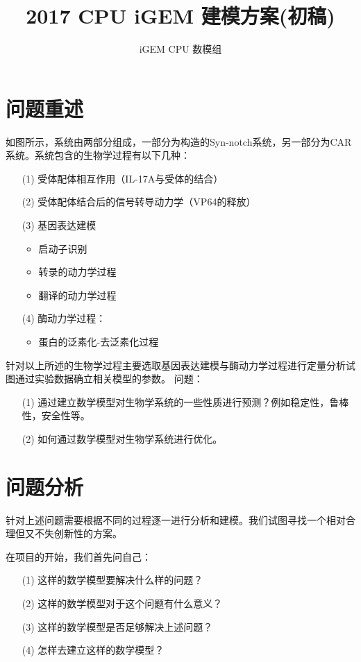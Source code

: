 \documentclass[UTF8]{ctexart}
\begin{document}
	\title{2017 CPU iGEM 建模方案(初稿)}
	\author{iGEM CPU 数模组}
	\maketitle
\section{问题重述}
如图所示，系统由两部分组成，一部分为构造的Syn-notch系统，另一部分为CAR系统。系统包含的生物学过程有以下几种：
\begin{enumerate}
	\item[(1)] 受体配体相互作用（IL-17A与受体的结合）
	\item[(2)] 受体配体结合后的信号转导动力学（VP64的释放）
	\item[(3)] 基因表达建模
\begin{itemize}
\item	启动子识别
\item	转录的动力学过程
\item	翻译的动力学过程
\end{itemize}
    \item[(4)] 酶动力学过程：
\begin{itemize}
	\item 蛋白的泛素化-去泛素化过程
\end{itemize}
\end{enumerate}

针对以上所述的生物学过程主要选取基因表达建模与酶动力学过程进行定量分析试图通过实验数据确立相关模型的参数。
问题：
\begin{enumerate}
\item[(1)] 通过建立数学模型对生物学系统的一些性质进行预测？例如稳定性，鲁棒性，安全性等。
\item[(2)] 如何通过数学模型对生物学系统进行优化。
\end{enumerate}
\section{问题分析}
针对上述问题需要根据不同的过程逐一进行分析和建模。我们试图寻找一个相对合理但又不失创新性的方案。

在项目的开始，我们首先问自己：
\begin{enumerate}
\item[(1)] 这样的数学模型要解决什么样的问题？
\item[(2)] 这样的数学模型对于这个问题有什么意义？
\item[(3)] 这样的数学模型是否足够解决上述问题？
\item[(4)] 怎样去建立这样的数学模型？
\end{enumerate}
\end{document}
